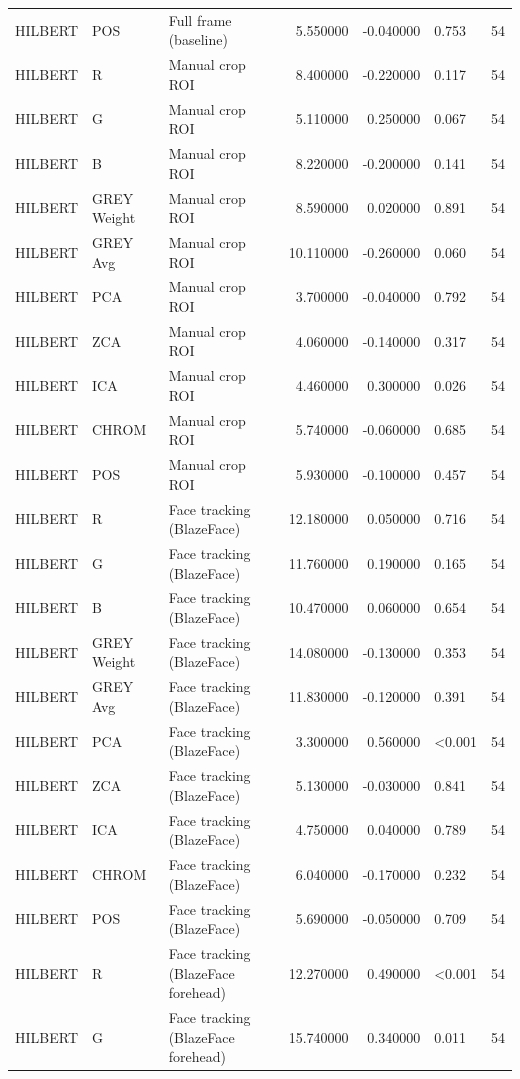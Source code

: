 \begin{table}[htbp]
\begin{tabular}{l l l r r l r}
HILBERT & POS & Full frame (baseline) & 5.550000 & -0.040000 & 0.753 & 54 \\
HILBERT & R & Manual crop ROI & 8.400000 & -0.220000 & 0.117 & 54 \\
HILBERT & G & Manual crop ROI & 5.110000 & 0.250000 & 0.067 & 54 \\
HILBERT & B & Manual crop ROI & 8.220000 & -0.200000 & 0.141 & 54 \\
HILBERT & GREY Weight & Manual crop ROI & 8.590000 & 0.020000 & 0.891 & 54 \\
HILBERT & GREY Avg & Manual crop ROI & 10.110000 & -0.260000 & 0.060 & 54 \\
HILBERT & PCA & Manual crop ROI & 3.700000 & -0.040000 & 0.792 & 54 \\
HILBERT & ZCA & Manual crop ROI & 4.060000 & -0.140000 & 0.317 & 54 \\
HILBERT & ICA & Manual crop ROI & 4.460000 & 0.300000 & 0.026 & 54 \\
HILBERT & CHROM & Manual crop ROI & 5.740000 & -0.060000 & 0.685 & 54 \\
HILBERT & POS & Manual crop ROI & 5.930000 & -0.100000 & 0.457 & 54 \\
HILBERT & R & Face tracking (BlazeFace) & 12.180000 & 0.050000 & 0.716 & 54 \\
HILBERT & G & Face tracking (BlazeFace) & 11.760000 & 0.190000 & 0.165 & 54 \\
HILBERT & B & Face tracking (BlazeFace) & 10.470000 & 0.060000 & 0.654 & 54 \\
HILBERT & GREY Weight & Face tracking (BlazeFace) & 14.080000 & -0.130000 & 0.353 & 54 \\
HILBERT & GREY Avg & Face tracking (BlazeFace) & 11.830000 & -0.120000 & 0.391 & 54 \\
HILBERT & PCA & Face tracking (BlazeFace) & 3.300000 & 0.560000 & <0.001 & 54 \\
HILBERT & ZCA & Face tracking (BlazeFace) & 5.130000 & -0.030000 & 0.841 & 54 \\
HILBERT & ICA & Face tracking (BlazeFace) & 4.750000 & 0.040000 & 0.789 & 54 \\
HILBERT & CHROM & Face tracking (BlazeFace) & 6.040000 & -0.170000 & 0.232 & 54 \\
HILBERT & POS & Face tracking (BlazeFace) & 5.690000 & -0.050000 & 0.709 & 54 \\
HILBERT & R & Face tracking (BlazeFace forehead) & 12.270000 & 0.490000 & <0.001 & 54 \\
HILBERT & G & Face tracking (BlazeFace forehead) & 15.740000 & 0.340000 & 0.011 & 54 \\

\end{tabular}
\end{table}
